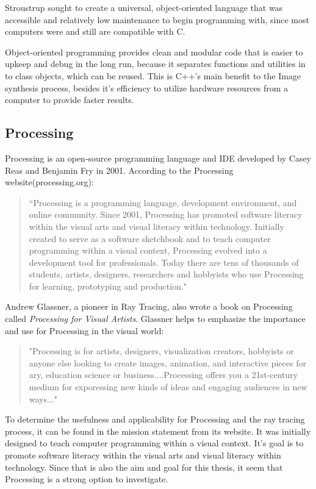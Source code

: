 Stroustrup sought to create a universal, object-oriented language that was accessible and relatively low maintenance to begin programming with, since most computers were and still are compatible with C.

Object-oriented programming provides clean and modular code that is easier to upkeep and debug in the long run, because it separates functions and utilities in to class objects, which can be reused.  This is C++'s main benefit to the Image synthesis process, besides it's efficiency to utilize hardware resources from a computer to provide faster results.

\subsection{Processing}
\label{sub:Processing}
Processing is an open-source programming language and IDE developed by Casey Reas and Benjamin Fry in 2001. According to the Processing website(processing.org):
\begin{quote}
``Processing is a programming language, development environment, and online community.  Since 2001, Processing has promoted software literacy within the visual arts and visual literacy within technology.  Initially created to serve as a software sketchbook and to teach computer programming within a visual context, Processing evolved into a development tool for professionals.  Today there are tens of thousands of students, artists, designers, researchers and hobbyists who use Processing for learning, prototyping and production."
\end{quote}

Andrew Glassner, a pioneer in Ray Tracing, also wrote a book on Processing called \textit{Processing for Visual Artists}.  Glassner helps to emphasize the importance and use for Processing in the visual world:

\begin{quote}
"Processing is for artists, designers, visualization creators, hobbyists or anyone else looking to create images, animation, and interactive pieces for ary, education science or business....Processing offers you a 21st-century medium for exporessing new kinds of ideas and engaging audiences in new ways..."
\end{quote}

To determine the usefulness and applicability for Processing and the ray tracing process, it can be found in the mission statement from its website.  It was initially designed to teach computer programming within a visual context.  It's goal is to promote software literacy within the visual arts and visual literacy within technology.  Since that is also the aim and goal for this thesis, it seem that Processing is a strong option to investigate.

